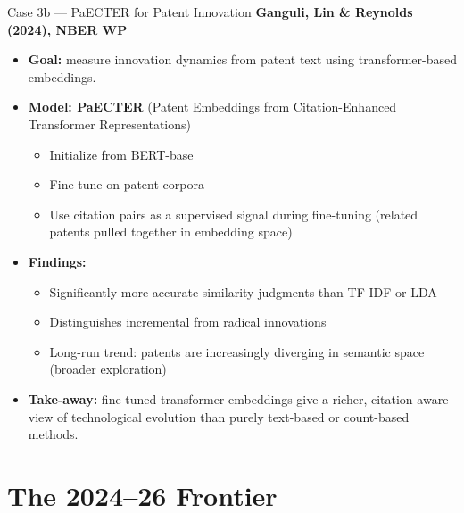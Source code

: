 \begin{frame}{Case 3b --- PaECTER for Patent Innovation}
\textbf{Ganguli, Lin \& Reynolds (2024), NBER WP}

\medskip
\begin{itemize}
\item \textbf{Goal:} measure innovation dynamics from patent text using transformer-based embeddings.

\medskip
\item \textbf{Model: PaECTER} (Patent Embeddings from Citation-Enhanced Transformer Representations)
\begin{itemize}
    \item Initialize from BERT-base
    \item Fine-tune on patent corpora
    \item Use citation pairs as a supervised signal during fine-tuning (related patents pulled together in embedding space)
\end{itemize}

\medskip
\item \textbf{Findings:}
\begin{itemize}
    \item Significantly more accurate similarity judgments than TF-IDF or LDA
    \item Distinguishes incremental from radical innovations
    \item Long-run trend: patents are increasingly diverging in semantic space (broader exploration)
\end{itemize}

\medskip
\item \textbf{Take-away:} fine-tuned transformer embeddings give a richer, citation-aware view of technological evolution than purely text-based or count-based methods.
\end{itemize}
\end{frame}

\section{The 2024--26 Frontier}

